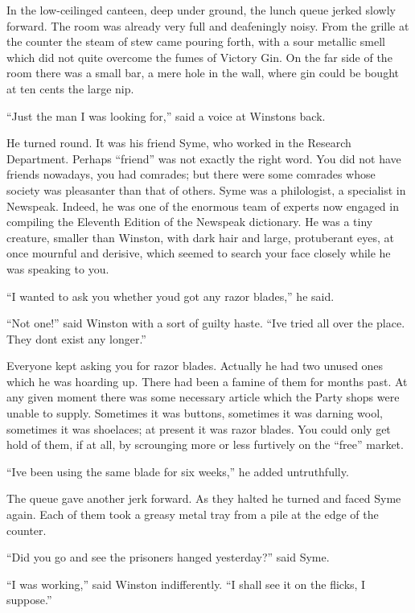 In the low-ceilinged canteen, deep under ground, the lunch queue jerked
slowly forward. The room was already very full and deafeningly noisy.
From the grille at the counter the steam of stew came pouring forth,
with a sour metallic smell which did not quite overcome the fumes of
Victory Gin. On the far side of the room there was a small bar, a mere
hole in the wall, where gin could be bought at ten cents the large nip.

``Just the man I was looking for,'' said a voice at
Winston\textquotesingle s back.

He turned round. It was his friend Syme, who worked in the Research
Department. Perhaps ``friend'' was not exactly the right word. You did not
have friends nowadays, you had comrades; but there were some comrades
whose society was pleasanter than that of others. Syme was a
philologist, a specialist in Newspeak. Indeed, he was one of the
enormous team of experts now engaged in compiling the Eleventh Edition
of the Newspeak dictionary. He was a tiny creature, smaller than
Winston, with dark hair and large, protuberant eyes, at once mournful
and derisive, which seemed to search your face closely while he was
speaking to you.

``I wanted to ask you whether you\textquotesingle d got any razor
blades,'' he said.

``Not one!'' said Winston with a sort of guilty haste.
``I\textquotesingle ve tried all over the place. They
don\textquotesingle t exist any longer.''

Everyone kept asking you for razor blades. Actually he had two unused
ones which he was hoarding up. There had been a famine of them for
months past. At any given moment there was some necessary article which
the Party shops were unable to supply. Sometimes it was buttons,
sometimes it was darning wool, sometimes it was shoelaces; at present it
was razor blades. You could only get hold of them, if at all, by
scrounging more or less furtively on the ``free'' market.

``I\textquotesingle ve been using the same blade for six weeks,'' he added
untruthfully.

The queue gave another jerk forward. As they halted he turned and faced
Syme again. Each of them took a greasy metal tray from a pile at the
edge of the counter.

``Did you go and see the prisoners hanged yesterday?'' said Syme.

``I was working,'' said Winston indifferently. ``I shall see it on the
flicks, I suppose.''

